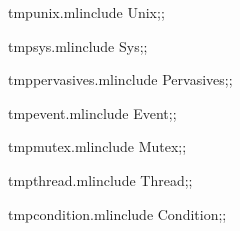 \documentclass[twoside,openright,a4paper,11pt]{memoir}
\title{\mytitle}
\author{\myauthors}
\date{\today}
\begin{document}
\pagestyle{empty}


\frontmatter
\pagestyle{myheaders}

\ifhtmlelse%
{\tableofcontents{}}%
{\tableofcontents*}

\mainmatter
{} %











\backmatter




\appendix

\renewcommand{\preindexhook} {
  \ifhtml{\aname{htocindex}{}} %
  \ifhtmlelse{Links}{Pages} in bold refer to the description of 
  a \textsc{posix} system call.
  \ifnothtml{\medskip}}

\printindex
{}

\pagestyle{empty}
\newpage
\mbox{}

\begin{codefile}{tmpunix.ml}include Unix;;\end{codefile}
\begin{codefile}{tmpsys.ml}include Sys;;\end{codefile}
\begin{codefile}{tmppervasives.ml}include Pervasives;;\end{codefile}
\begin{codefile}{tmpevent.ml}include Event;;\end{codefile}
\begin{codefile}{tmpmutex.ml}include Mutex;;\end{codefile}
\begin{codefile}{tmpthread.ml}include Thread;;\end{codefile}
\begin{codefile}{tmpcondition.ml}include Condition;;\end{codefile}
\end{document}
